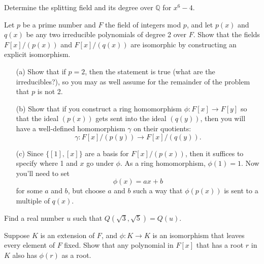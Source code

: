 \documentclass[12pt,letterpaper]{hmcpset}
\newcommand{\Qq}{\mathbb{Q}}
\begin{document}

\begin{problem}[13.4.4]
  Determine the splitting field and its degree over $\Qq$ for $x^6-4$.
\end{problem}
\begin{solution}
\vfill
\end{solution}
\newpage

\begin{problem}[B.]
  Let $p$ be a prime number and $F$ the field of integers mod $p$, and let $p(x)$ and $q(x)$ be any two irreducible polynomials of degree 2 over $F$. Show that the fields $F[x]/(p(x))$ and $F[x]/(q(x))$ are isomorphic by constructing an explicit isomorphism.
  \begin{enumerate}
    \item[(a)] Show that if $p=2$, then the statement is true (what are the irreducibles?), so you may as well assume for the remainder of the problem that $p$ is not 2.
    \item[(b)] Show that if you construct a ring homomorphism $\phi : F[x] \to F[y]$ so that the ideal $(p(x))$ gets sent into the ideal $(q(y))$, then you will have a well-defined homomorphism $\gamma$ on their quotients: $$ \gamma: F[x]/(p(y)) \to F[x]/(q(y)).$$
    \item[(c)] Since $\{[1], [x]\}$ are a basis for $F[x]/(p(x))$, then it suffices to specify where 1 and $x$ go under $\phi$. As a ring homomorphism, $\phi(1)=1$.  Now you'll need to set $$\phi(x) = ax+b $$ for some $a$ and $b$, but choose $a$ and $b$ such a way that $\phi(p(x))$ is sent to a multiple of $q(x)$.  
  \end{enumerate}
\end{problem}
\begin{solution}
	\vfill
\end{solution}
\newpage

\begin{problem}[C.]
  Find a real number $u$ such that $Q(\sqrt{3},\sqrt{5})=Q(u)$.
\end{problem}
\begin{solution}
	\vfill
\end{solution}
\newpage

\begin{problem}[D.]
	Suppose $K$ is an extension of $F$, and $\phi : K \to K$ is an isomorphism that leaves every element of $F$ fixed. Show that any polynomial in $F[x]$ that has a root $r$ in $K$ also has $\phi(r)$ as a root.
\end{problem}
\begin{solution}
	\vfill
\end{solution}
\end{document}
